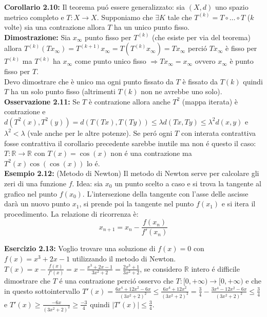 \documentclass[a4paper,11pt,titlepage]{book}
\begin{document}
\textbf{Corollario 2.10:} Il teorema puó essere generalizzato: sia $(X,d)$ uno spazio metrico completo e $T:X\to X$. Supponiamo che $\exists K$ tale che $T^{(k)}=T\circ\ldots\circ T$ ($k$ volte) sia una contrazione allora $T$ ha un unico punto fisso.\\

\textbf{Dimostrazione:} Sia $x_\infty$ punto fisso per $T^{(k)}$ (che esiste per via del teorema) allora $T^{(k)}(Tx_\infty)=T^{(k+1)}x_\infty=T(T^{(k)} x_\infty)=Tx_\infty$ perció $Tx_\infty$ è fisso per $T^{(k)}$ ma $T^{(k)}$ ha $x_\infty$ come punto unico fisso $\Rightarrow Tx_\infty=x_\infty$ ovvero $x_\infty$ è punto fisso per $T$.\\

Devo dimostrare che è unico ma ogni punto fissato da $T$ è fissato da $T{(k)}$ quindi $T$ ha un solo punto fisso (altrimenti $T{(k)}$ non ne avrebbe uno solo).\\

\textbf{Osservazione 2.11:} Se $T$ è contrazione allora anche $T^{2}$ (mappa iterata) è contrazione e $d(T^2(x),T^2(y))=d(T(Tx),T(Ty))\leq\lambda d(Tx,Ty)\leq \lambda^2 d(x,y)$ e $\lambda^2<\lambda$ (vale anche per le altre potenze). Se peró ogni $T$ con interata contrattiva fosse contrattiva il corollario precedente sarebbe inutile ma non é questo il caso: \\

$T:\mathbb{R}\to\mathbb{R}$ con $T(x)=\cos (x)$ non é una contrazione ma $T^2(x)\cos(\cos(x))$ lo é. \\

\textbf{Esempio 2.12:} (Metodo di Newton) Il metodo di Newton serve per calcolare gli zeri di una funzione $f$. Idea: sia $x_0$ un punto scelto a caso e si trova la tangente al grafico nel punto $f(x_0)$. L'intersezione della tangente con l'asse delle ascisse darà un nuovo punto $x_1$, si prende poi la tangente nel punto $f(x_1)$ e si itera il procedimento. La relazione di ricorrenza è: $$x_{n+1}=x_n-\frac{f(x_n)}{f'(x_n)}$$ 

\textbf{Esercizio 2.13:} Voglio trovare una soluzione di $f(x)=0$ con $f(x)=x^3+2x-1$ utilizzando il metodo di Newton. $T(x)=x-\frac{f(x)}{f'(x)}=x-\frac{x^3+2x-1}{3x^2+2}=\frac{2x^3+1}{3x^2+2}$, se considero $\mathbb{R}$ intero é difficile dimostrare che $T$ é una contrazione perció osservo che $T:[0,+\infty)\to[0,+\infty)$ e che in questo sottointervallo $T'(x)=\frac{6x^4+12x^2-6x}{(3x^2+2)^2}\leq\frac{6x^4+12x^2}{(3x^2+2)^2}=\frac{3}{4}-\frac{3x^4-12x^2-6x}{(3x^2+2)^2}\leq\frac{3}{4}$ e $T'(x)\geq\frac{-6x}{(3x^2+2)^2}\geq\frac{-3}{4}$ quindi $|T'(x)|\leq\frac{3}{4}$. \\
\end{document}
